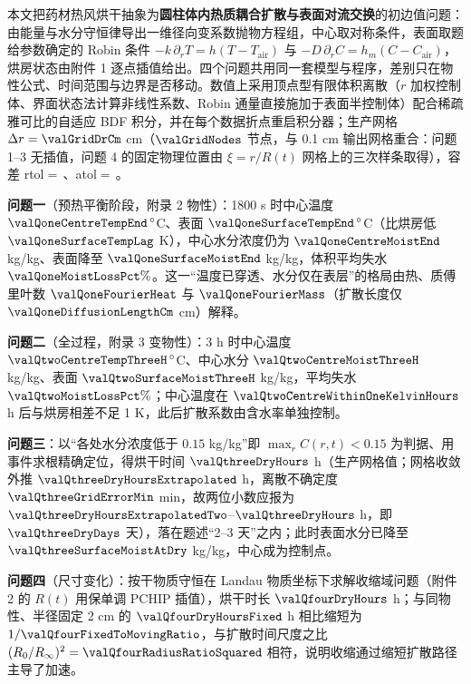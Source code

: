 本文把药材热风烘干抽象为\textbf{圆柱体内热质耦合扩散与表面对流交换}的初边值问题：由能量与水分守恒律导出一维径向变系数抛物方程组，中心取对称条件，表面取题给参数确定的 Robin 条件 $-k\,\partial_r T=h(T-T_{\mathrm{air}})$ 与 $-D\,\partial_r C=h_m(C-C_{\mathrm{air}})$，烘房状态由附件 1 逐点插值给出。四个问题共用同一套模型与程序，差别只在物性公式、时间范围与边界是否移动。数值上采用顶点型有限体积离散（$r$ 加权控制体、界面状态法计算非线性系数、Robin 通量直接施加于表面半控制体）配合稀疏雅可比的自适应 BDF 积分，并在每个数据折点重启积分器；生产网格 $\Delta r=\valGridDrCm$ cm（$\valGridNodes$ 节点，与 0.1 cm 输出网格重合：问题 1--3 无插值，问题 4 的固定物理位置由 $\xi=r/R(t)$ 网格上的三次样条取得），容差 rtol$=$\,\sci{\valTimeRtol}、atol$=$\,\sci{\valTimeAtol}。

\textbf{问题一}（预热平衡阶段，附录 2 物性）：1800 s 时中心温度 $\valQoneCentreTempEnd\,^\circ$C、表面 $\valQoneSurfaceTempEnd\,^\circ$C（比烘房低 $\valQoneSurfaceTempLag$ K），中心水分浓度仍为 $\valQoneCentreMoistEnd$ kg/kg、表面降至 $\valQoneSurfaceMoistEnd$ kg/kg，体积平均失水 $\valQoneMoistLossPct\%$。这一“温度已穿透、水分仅在表层”的格局由热、质傅里叶数 $\valQoneFourierHeat$ 与 $\valQoneFourierMass$（扩散长度仅 $\valQoneDiffusionLengthCm$ cm）解释。

\textbf{问题二}（全过程，附录 3 变物性）：3 h 时中心温度 $\valQtwoCentreTempThreeH\,^\circ$C、中心水分 $\valQtwoCentreMoistThreeH$ kg/kg、表面 $\valQtwoSurfaceMoistThreeH$ kg/kg，平均失水 $\valQtwoMoistLossPct\%$；中心温度在 $\valQtwoCentreWithinOneKelvinHours$ h 后与烘房相差不足 1 K，此后扩散系数由含水率单独控制。

\textbf{问题三}：以“各处水分浓度低于 $0.15$ kg/kg”即 $\max_r C(r,t)<0.15$ 为判据、用事件求根精确定位，得烘干时间 $\valQthreeDryHours$ h（生产网格值；网格收敛外推 $\valQthreeDryHoursExtrapolated$ h，离散不确定度 $\valQthreeGridErrorMin$ min，故两位小数应报为 $\valQthreeDryHoursExtrapolatedTwo$--$\valQthreeDryHours$ h，即 $\valQthreeDryDays$ 天），落在题述“2--3 天”之内；此时表面水分已降至 $\valQthreeSurfaceMoistAtDry$ kg/kg，中心成为控制点。

\textbf{问题四}（尺寸变化）：按干物质守恒在 Landau 物质坐标下求解收缩域问题（附件 2 的 $R(t)$ 用保单调 PCHIP 插值），烘干时长 $\valQfourDryHours$ h；与同物性、半径固定 2 cm 的 $\valQfourDryHoursFixed$ h 相比缩短为 $1/\valQfourFixedToMovingRatio$，与扩散时间尺度之比 $(R_0/R_\infty)^2=\valQfourRadiusRatioSquared$ 相符，说明收缩通过缩短扩散路径主导了加速。

